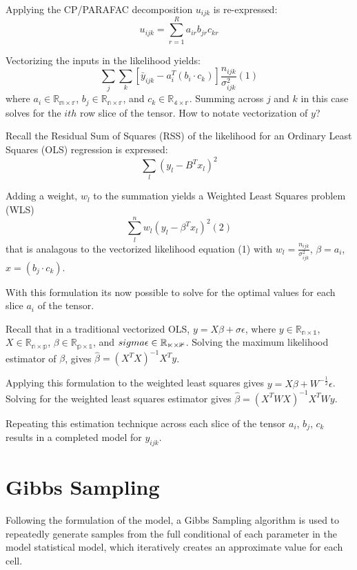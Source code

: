 \documentclass[12pt,twoside]{dukestatscithesis}
\theoremstyle{definition}
\theoremstyle{definition}
\theoremstyle{definition}
\theoremstyle{remark}
\begin{document}
Applying the CP/PARAFAC decomposition \(u_{ijk}\) is re-expressed:
\[u_{ijk} = \sum_{r=1}^Ra_{ir}b_{jr}c_{kr}\]

Vectorizing the inputs in the likelihood yields:
\[\sum_j\sum_k[\bar y_{ijk} - a_i^T(b_i \cdotp c_k)]\frac{n_{ijk}}{\sigma^2_{ijk}} (1)\]
where \(a_i \in \mathbb{R_{m \times r}}\),
\(b_j \in \mathbb{R_{n \times r}}\), and
\(c_k \in \mathbb{R_{4 \times r}}\). Summing across \(j\) and \(k\) in
this case solves for the \(ith\) row slice of the tensor. How to notate
vectorization of \(y\)?

Recall the Residual Sum of Squares (RSS) of the likelihood for an
Ordinary Least Squares (OLS) regression is expressed:
\[\sum_l(y_l-B^Tx_l)^2\]

Adding a weight, \(w_l\) to the summation yields a Weighted Least
Squares problem (WLS) \[\sum_l^nw_l(y_l-\beta^Tx_l)^2 (2)\] that is
analagous to the vectorized likelihood equation (1) with
\(w_l = \frac{n_{ijk}}{\sigma^2_{ijk}}\), \(\beta = a_i\),
\(x = (b_j \cdotp c_k)\).

With this formulation its now possible to solve for the optimal values
for each slice \(a_i\) of the tensor.

Recall that in a traditional vectorized OLS,
\(y = X\beta + \sigma\epsilon\), where
\(y \in \mathbb{R_{n \times 1}}\), \(X \in \mathbb{R_{n \times p}}\),
\(\beta \in \mathbb{R_{p \times 1}}\), and
\(\\sigma\epsilon \in \mathbb{R_{n \times 1}}\). Solving the maximum
likelihood estimator of \(\beta\), gives
\(\hat \beta = (X^TX)^{-1}X^Ty\).

Applying this formulation to the weighted least squares gives
\(y = X\beta + W^{-\frac{1}{2}}\epsilon\). Solving for the weighted
least squares estimator gives \(\hat \beta = (X^TWX)^{-1}X^TWy\).

Repeating this estimation technique across each slice of the tensor
\(a_i\), \(b_j\), \(c_k\) results in a completed model for \(y_{ijk}\).

\section{Gibbs Sampling}\label{gibbs-sampling}

Following the formulation of the model, a Gibbs Sampling algorithm is
used to repeatedly generate samples from the full conditional of each
parameter in the model statistical model, which iteratively creates an
approximate value for each cell.
\end{document}
